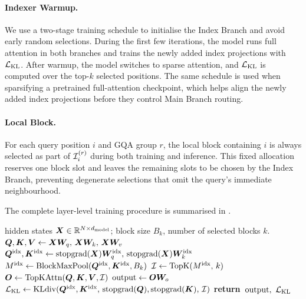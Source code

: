 \paragraph{Indexer Warmup.} We use a two-stage training schedule to initialise the Index Branch and avoid early random selections. During the first few iterations, the model runs full attention in both branches and trains the newly added index projections with $\Ls_{\rm KL}$. After warmup, the model switches to sparse attention, and $\Ls_{\rm KL}$ is computed over the top-$k$ selected positions. The same schedule is used when sparsifying a pretrained full-attention checkpoint, which helps align the newly added index projections before they control Main Branch routing.


\paragraph{Local Block.} For each query position $i$ and GQA group $r$, the local block containing $i$ is always selected as part of ${\mathcal{I}}_i^{(r)}$ during both training and inference. This fixed allocation reserves one block slot and leaves the remaining slots to be chosen by the Index Branch, preventing degenerate selections that omit the query's immediate neighbourhood.



The complete layer-level training procedure is summarised in .

\begin{algorithm}[t]
\caption{One \method{} layer: training forward and the auxiliary KL loss. The layer returns its output and per-layer $\Ls_{\rm KL}$; the model loss $\Ls = \Ls_{\rm LM} + \lambda\sum_{\rm layers}\Ls_{\rm KL}$ is assembled by the training loop.}
\label{alg:msa-train}
\begin{algorithmic}[1]
\REQUIRE hidden states ${\bm{X}} \in \mathbb{R}^{N \times d_{\rm model}}$; block size $B_k$,
number of selected blocks $k$.
\STATE ${\bm{Q}}, {\bm{K}}, {\bm{V}} \leftarrow {\bm{X}}{\bm{W}}_q,\, {\bm{X}}{\bm{W}}_k,\, {\bm{X}}{\bm{W}}_v$
\STATE ${\bm{Q}}^{\rm idx}, {\bm{K}}^{\rm idx} \leftarrow
       \mathrm{stopgrad}({\bm{X}}){\bm{W}}^{\rm idx}_q,\, \mathrm{stopgrad}({\bm{X}}){\bm{W}}^{\rm idx}_k$
\STATE $M^{\rm idx} \leftarrow \mathrm{BlockMaxPool}({\bm{Q}}^{\rm idx}, {\bm{K}}^{\rm idx}, B_k)$
\STATE ${\mathcal{I}} \leftarrow \mathrm{TopK}(M^{\rm idx},\, k)$
\STATE ${\bm{O}} \leftarrow \mathrm{TopKAttn}({\bm{Q}}, {\bm{K}}, {\bm{V}}, {\mathcal{I}})$
\STATE $\mathrm{output} \leftarrow {\bm{O}}{\bm{W}}_o$
\STATE $\mathcal{L}_{\rm KL} \leftarrow
       \mathrm{KLdiv}({\bm{Q}}^{\rm idx}, {\bm{K}}^{\rm idx},\, \mathrm{stopgrad}({\bm{Q}}), \mathrm{stopgrad}({\bm{K}}),\, {\mathcal{I}})$
\STATE \textbf{return}~$\mathrm{output},\ \mathcal{L}_{\rm KL}$
\end{algorithmic}
\end{algorithm}



